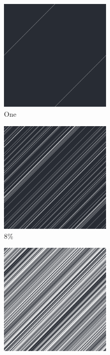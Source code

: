 \documentclass[12pt, fleqn]{report}                             %
\theoremstyle{break}                                            %
\begin{document}
      \begin{figure}[ht!]
        \centering
        \begin{subfigure}[b]{0.4\linewidth}
          \includegraphics[width=0.6\textwidth]{Images/170/a.png}
          \caption{One}
        \end{subfigure}
        \begin{subfigure}[b]{0.4\linewidth}
          \includegraphics[width=0.6\textwidth]{Images/170/b.png}
          \caption{8\%}
        \end{subfigure}
        \begin{subfigure}[b]{0.4\linewidth}
          \includegraphics[width=0.6\textwidth]{Images/170/c.png}

\end{subfigure}
\end{figure}
\end{document}
